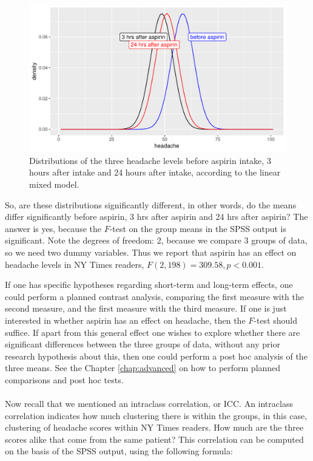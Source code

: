 \documentclass[]{book}\usepackage[]{graphicx}\usepackage[]{color}
\makeatletter
\def\maxwidth{ %
  \ifdim\Gin@nat@width>\linewidth
    \linewidth
  \else
    \Gin@nat@width
  \fi
}
\newenvironment{knitrout}{}{} %
\makeatother
\begin{document}
\begin{knitrout}
\color{fgcolor}\begin{figure}

{\centering \includegraphics[width=\maxwidth]{figure/analysispremidpost3-1} 

}

\caption[Distributions of the three headache levels before aspirin intake, 3 hours after intake and 24 hours after intake, according to the linear mixed model]{Distributions of the three headache levels before aspirin intake, 3 hours after intake and 24 hours after intake, according to the linear mixed model.}\label{fig:analysispremidpost3}
\end{figure}


\end{knitrout}



So, are these distributions significantly different, in other words, do the means differ significantly before aspirin, 3 hrs after aspirin and 24 hrs after aspirin? The answer is yes, because the $F$-test on the group means in the SPSS output is significant. Note the degrees of freedom: 2, because we compare 3 groups of data, so we need two dummy variables. Thus we report that aspirin has an effect on headache levels in NY Times readers, $F(2, 198)=309.58, p<0.001$.

If one has specific hypotheses regarding short-term and long-term effects, one could perform a planned contrast analysis, comparing the first measure with the second measure, and the first measure with the third measure. If one is just interested in whether aspirin has an effect on headache, then the $F$-test should suffice. If apart from this general effect one wishes to explore whether there are significant differences between the three groups of data, without any prior research hypothesis about this, then one could perform a post hoc analysis of the three means. See the Chapter \ref{chap:advanced} on how to perform planned comparisons and post hoc tests.
\\
\\
Now recall that we mentioned an intraclass correlation, or ICC. An intraclass correlation indicates how much clustering there is within the groups, in this case, clustering of headache scores within NY Times readers. How much are the three scores alike that come from the same patient? This correlation can be computed on the basis of the SPSS output, using the following formula:
\end{document}
